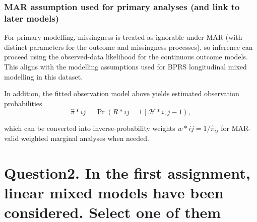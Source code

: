 \documentclass[
  11pt,
  letterpaper,
  DIV=11,
  numbers=noendperiod]{scrartcl}
\begin{document}
\subsubsection{MAR assumption used for primary analyses (and link to
later
models)}\label{mar-assumption-used-for-primary-analyses-and-link-to-later-models}

For primary modelling, missingness is treated as ignorable under MAR
(with distinct parameters for the outcome and missingness processes), so
inference can proceed using the observed-data likelihood for the
continuous outcome models. This aligns with the modelling assumptions
used for BPRS longitudinal mixed modelling in this dataset.

In addition, the fitted observation model above yields estimated
observation probabilities \[
\widehat{\pi}*{ij}=\Pr(R*{ij}=1 \mid \mathcal{H}*{i,j-1}),
\]

which can be converted into inverse-probability weights
\(w*{ij}=1/\widehat{\pi}_{ij}\) for MAR-valid weighted marginal analyses
when needed.

\section{Question2. In the first assignment, linear mixed models have
been considered. Select one of
them}\label{question2.-in-the-first-assignment-linear-mixed-models-have-been-considered.-select-one-of-them}
\end{document}
